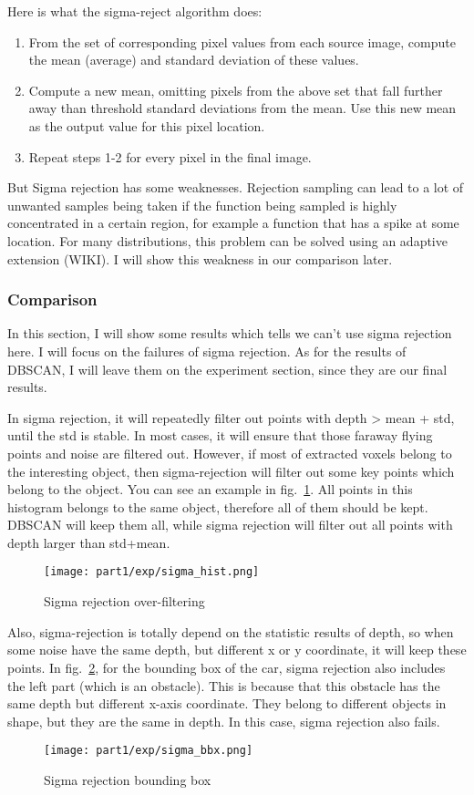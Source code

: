 \documentclass[12pt]{article}
\begin{document}
Here is what the sigma-reject algorithm does:
\begin{enumerate}
    \item From the set of corresponding pixel values from each source image, compute the mean (average) and standard deviation of these values.
    \item Compute a new mean, omitting pixels from the above set that fall further away than threshold standard deviations from the mean. Use this new mean as the output value for this pixel location.
    \item Repeat steps 1-2 for every pixel in the final image.
\end{enumerate}

But Sigma rejection has some weaknesses. Rejection sampling can lead to a lot of unwanted samples being taken if the function being sampled is highly concentrated in a certain region, for example a function that has a spike at some location. For many distributions, this problem can be solved using an adaptive extension (WIKI). I will show this weakness in our comparison later.

\subsubsection{Comparison}
In this section, I will show some results which tells we can't use sigma rejection here. I will focus on the failures of sigma rejection. As for the results of DBSCAN, I will leave them on the experiment section, since they are our final results.

In sigma rejection, it will repeatedly filter out points with depth > mean + std, until the std is stable. In most cases, it will ensure that those faraway flying points and noise are filtered out. However, if most of extracted voxels belong to the interesting object, then sigma-rejection will filter out some key points which belong to the object. You can see an example in fig.~\ref{sigma_hist}. All points in this histogram belongs to the same object, therefore all of them should be kept. DBSCAN will keep them all, while sigma rejection will filter out all points with depth larger than std+mean.
\begin{figure}[H]
    \centering
    \texttt{[image: part1/exp/sigma\_hist.png]}
    \caption{Sigma rejection over-filtering}
    \label{sigma_hist}
\end{figure}

Also, sigma-rejection is totally depend on the statistic results of depth, so when some noise have the same depth, but different x or y coordinate, it will keep these points. In fig.~\ref{sigma_bbx}, for the bounding box of the car, sigma rejection also includes the left part (which is an obstacle). This is because that this obstacle has the same depth but different x-axis coordinate. They belong to different objects in shape, but they are the same in depth. In this case, sigma rejection also fails.
\begin{figure}[H]
    \centering
    \texttt{[image: part1/exp/sigma\_bbx.png]}
    \caption{Sigma rejection bounding box}
    \label{sigma_bbx}
\end{figure}
\end{document}
